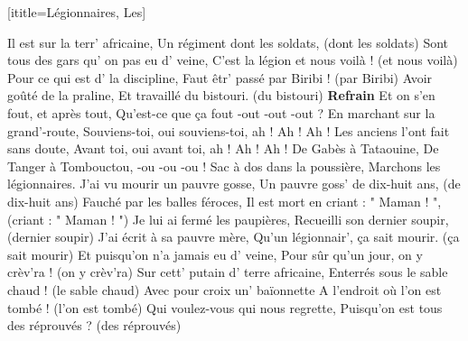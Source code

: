  [ititle={Légionnaires, Les}]

\beginverse
Il est sur la terr' africaine,
Un régiment dont les soldats, (dont les soldats)
Sont tous des gars qu' on pas eu d' veine,
C'est la légion et nous voilà ! (et nous voilà)
Pour ce qui est d' la discipline,
Faut êtr' passé par Biribi ! (par Biribi)
Avoir goûté de la praline,
Et travaillé du bistouri. (du bistouri)
\endverse
\beginchorus
\textbf{Refrain}
Et on s'en fout, et après tout,
Qu'est-ce que ça fout -out -out -out ?
En marchant sur la grand'-route,
Souviens-toi, oui souviens-toi, ah ! Ah ! Ah !
Les anciens l'ont fait sans doute,
Avant toi, oui avant toi, ah ! Ah ! Ah !
De Gabès à Tataouine,
De Tanger à Tombouctou, -ou -ou -ou !
Sac à dos dans la poussière,
Marchons les légionnaires.
\endchorus
\beginverse
J'ai vu mourir un pauvre gosse,
Un pauvre goss' de dix-huit ans, (de dix-huit ans)
Fauché par les balles féroces,
Il est mort en criant : " Maman ! ", (criant : " Maman ! ")
Je lui ai fermé les paupières,
Recueilli son dernier soupir, (dernier soupir)
J'ai écrit à sa pauvre mère,
Qu'un légionnair', ça sait mourir. (ça sait mourir)
\endverse
\beginverse
Et puisqu'on n'a jamais eu d' veine,
Pour sûr qu'un jour, on y crèv'ra ! (on y crèv'ra)
Sur cett' putain d' terre africaine,
Enterrés sous le sable chaud ! (le sable chaud)
Avec pour croix un' baïonnette
A l'endroit où l'on est tombé ! (l'on est tombé)
Qui voulez-vous qui nous regrette,
Puisqu'on est tous des réprouvés ? (des réprouvés)
\endverse
\endsong